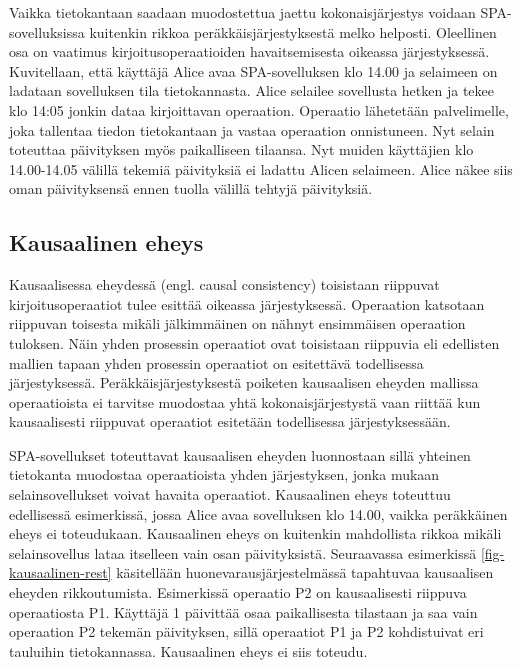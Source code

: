 \documentclass[finnish,twoside,censored,csm,sw-track-2018]{HYthesisML}
\begin{document}
Vaikka tietokantaan saadaan muodostettua jaettu kokonaisjärjestys voidaan SPA-sovelluksissa kuitenkin rikkoa peräkkäisjärjestyksestä melko helposti. Oleellinen osa on vaatimus kirjoitusoperaatioiden havaitsemisesta oikeassa järjestyksessä. Kuvitellaan, että käyttäjä Alice avaa SPA-sovelluksen klo 14.00 ja selaimeen on ladataan sovelluksen tila tietokannasta. Alice selailee sovellusta hetken ja tekee klo 14:05 jonkin dataa kirjoittavan operaation. Operaatio lähetetään palvelimelle, joka tallentaa tiedon tietokantaan ja vastaa operaation onnistuneen. Nyt selain toteuttaa päivityksen myös paikalliseen tilaansa. Nyt muiden käyttäjien klo 14.00-14.05 välillä tekemiä päivityksiä ei ladattu Alicen selaimeen. Alice näkee siis oman päivityksensä ennen tuolla välillä tehtyjä päivityksiä.

\subsection{Kausaalinen eheys}

Kausaalisessa eheydessä (engl. causal consistency) toisistaan riippuvat kirjoitusoperaatiot tulee esittää oikeassa järjestyksessä. Operaation katsotaan riippuvan toisesta mikäli jälkimmäinen on nähnyt ensimmäisen operaation tuloksen. Näin yhden prosessin operaatiot ovat toisistaan riippuvia eli edellisten mallien tapaan yhden prosessin operaatiot on esitettävä todellisessa järjestyksessä. Peräkkäisjärjestyksestä poiketen kausaalisen eheyden mallissa operaatioista ei tarvitse muodostaa yhtä kokonaisjärjestystä vaan riittää kun kausaalisesti riippuvat operaatiot esitetään todellisessa järjestyksessään.

SPA-sovellukset toteuttavat kausaalisen eheyden luonnostaan sillä yhteinen tietokanta muodostaa operaatioista yhden järjestyksen, jonka mukaan selainsovellukset voivat havaita operaatiot.  Kausaalinen eheys toteuttuu edellisessä esimerkissä, jossa Alice avaa sovelluksen klo 14.00, vaikka peräkkäinen eheys ei toteudukaan. Kausaalinen eheys on kuitenkin mahdollista rikkoa mikäli selainsovellus lataa itselleen vain osan päivityksistä. Seuraavassa esimerkissä \ref{fig-kausaalinen-rest} käsitellään huonevarausjärjestelmässä tapahtuvaa kausaalisen eheyden rikkoutumista. Esimerkissä operaatio P2 on kausaalisesti riippuva operaatiosta P1. Käyttäjä 1 päivittää osaa paikallisesta tilastaan ja saa vain operaation P2 tekemän päivityksen, sillä operaatiot P1 ja P2 kohdistuivat eri tauluihin tietokannassa. Kausaalinen eheys ei siis toteudu.
\end{document}
